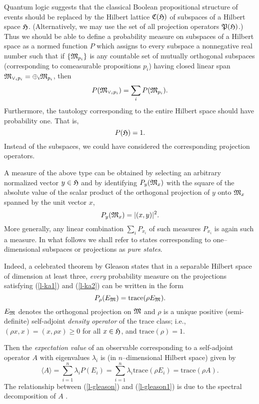 \documentclass[%
  preprint,
 showpacs,
 showkeys,
 preprintnumbers,
 amsmath,amssymb,
 aps,
 rmp,
  longbibliography,
 ]{revtex4-1}
\def\hh{{\frak H}}
\def\ll{{\frak C (\frak H)}}
\def\mm{{\frak M}}
\def\ppp{{\frak P} (\frak H)}
\begin{document}
Quantum logic suggests that the classical Boolean propositional
structure of events should be replaced by the Hilbert
lattice $\ll$ of subspaces
of a Hilbert space $\hh$. (Alternatively, we may use
the set of all projection operators $\ppp$.)
Thus we should be able to define a probability measure on subspaces of a
Hilbert space  as a normed function
$P$ which assigns to every subspace a nonnegative real number such that
if $\{\mm_{p_i} \}$ is any countable set of mutually orthogonal
subspaces   (corresponding to comeasurable propositions $p_i$) having
closed linear span $\mm_{\vee_i p_i}=\oplus_i \mm_{p_i}$, then
\begin{equation}
P(\mm_{\vee_i p_i})=\sum_i P(\mm_{p_i}). \label{l-ka1}
\end{equation}
Furthermore, the tautology corresponding to the entire Hilbert space
should have probability one. That is,
\begin{equation}
P({\frak H})=1. \label{l-ka2}
\end{equation}
Instead of the subspaces, we could have considered the corresponding
projection operators.


A measure of the above type can be obtained by selecting
an arbitrary normalized vector $ y\in \hh$ and by identifying
$P_{y}(\mm_x)$ with the square of the absolute value of the scalar
product of the orthogonal projection of $y$ onto $\mm_x$ spanned by the
unit vector $x$,
$$P_{ y}(\mm_x) =\vert (x,y)\vert^2 .$$
More generally, any linear combination
$\sum_i P_{ x_i}$
of such
measures $P_{ x_i}$ is again such a measure.
In what follows we shall refer to states corresponding to
one--dimensional subspaces or projections
as {\em pure states}.


Indeed, a celebrated theorem by Gleason \cite{Gleason} states
that
in
a separable Hilbert space of dimension at least three,
{\em every} probability measure on the projections
satisfying (\ref{l-ka1})  and (\ref{l-ka2})
can be written in the form
\begin{equation}
\label{l-gleason}
P_\rho (E_\mm )=\textrm{trace}(\rho E_\mm).
\end{equation}
$E_\mm$ denotes the orthogonal projection on $\mm$ and
$\rho $ is a unique positive (semi-definite) self-adjoint {\em density
operator} of the trace class;
i.e.,
$(\rho x,x)=(x,\rho x)\ge 0$ for all $x\in \hh$, and
$\textrm{trace}(\rho )=1$.


Then the {\em expectation value}
of an observable corresponding to a self-adjoint operator $A$ with
eigenvalues $\lambda_i$ is
(in $n$--dimensional Hilbert space) given by
\begin{equation}
\label{l-gleason1}
\langle A\rangle =
\sum_{i=1}^n \lambda_i P(E_i) =
\sum_{i=1}^n \lambda_i \textrm{trace}(\rho E_i)=
\textrm{trace}(\rho A).
\end{equation}
The relationship between
(\ref{l-gleason})       and
(\ref{l-gleason1})
is due to the spectral decomposition of $A$ .
\end{document}
